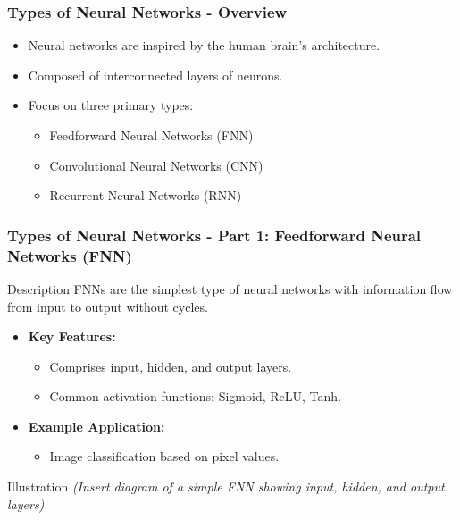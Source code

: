 \documentclass[aspectratio=169]{beamer}
\begin{document}
\begin{frame}[fragile]
  \frametitle{Types of Neural Networks - Overview}
  \begin{itemize}
    \item Neural networks are inspired by the human brain's architecture.
    \item Composed of interconnected layers of neurons.
    \item Focus on three primary types:
      \begin{itemize}
        \item Feedforward Neural Networks (FNN)
        \item Convolutional Neural Networks (CNN)
        \item Recurrent Neural Networks (RNN)
      \end{itemize}
  \end{itemize}
\end{frame}

\begin{frame}[fragile]
  \frametitle{Types of Neural Networks - Part 1: Feedforward Neural Networks (FNN)}
  \begin{block}{Description}
    FNNs are the simplest type of neural networks with information flow from input to output without cycles.
  \end{block}
  
  \begin{itemize}
    \item \textbf{Key Features:}
      \begin{itemize}
        \item Comprises input, hidden, and output layers.
        \item Common activation functions: Sigmoid, ReLU, Tanh.
      \end{itemize}

    \item \textbf{Example Application:}
      \begin{itemize}
        \item Image classification based on pixel values.
      \end{itemize}
  \end{itemize}
  
  \begin{block}{Illustration}
    \textit{(Insert diagram of a simple FNN showing input, hidden, and output layers)}
  \end{block}
\end{frame}
\end{document}
